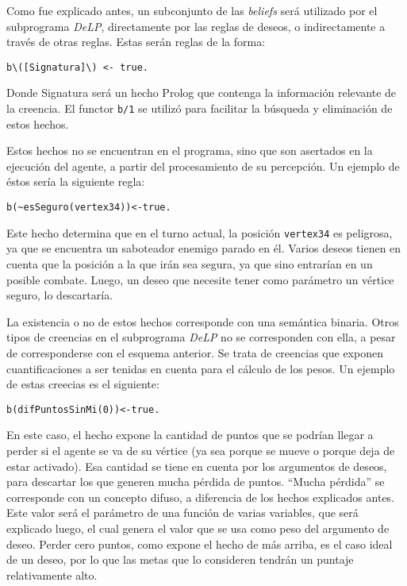 \documentclass[oneside]{book}
\begin{document}
Como fue explicado antes, %
un subconjunto de las  \textit{beliefs} será utilizado por el subprograma 
\textit{DeLP}, directamente por 
las reglas de deseos, o indirectamente a través de otras reglas. Estas serán reglas de 
la forma:

\begin{verbatim}
b\([Signatura]\) <- true.
\end{verbatim}

Donde Signatura será un hecho Prolog que contenga la información relevante de la 
creencia. El functor \texttt{b/1} se utilizó para facilitar la búsqueda y 
eliminación de estos hechos. 

Estos hechos no se encuentran en el programa, sino que son asertados en la ejecución
del agente, a partir del procesamiento de su percepción. 
Un ejemplo de éstos sería la siguiente regla:

\begin{verbatim}
b(~esSeguro(vertex34))<-true.
\end{verbatim}

Este hecho determina que en el turno actual, la posición \texttt{vertex34} es peligrosa,
ya que se encuentra un saboteador enemigo parado en él. Varios deseos tienen en cuenta
que la posición a la que irán sea segura, ya que sino entrarían en un posible combate.
Luego, un deseo que necesite tener como parámetro un vértice seguro, lo descartaría.

La existencia o no de estos hechos corresponde con una semántica binaria. Otros tipos de
creencias en el subprograma \textit{DeLP} no se corresponden con ella, a pesar de corresponderse
con el esquema anterior. Se trata de creencias que exponen cuantificaciones a ser 
tenidas en cuenta para el cálculo de los pesos. Un ejemplo de estas creecias es el 
siguiente:

\begin{verbatim}
b(difPuntosSinMi(0))<-true.
\end{verbatim}

En este caso, el hecho expone la cantidad de puntos que se podrían llegar a perder si el
agente se va de su vértice (ya sea porque se mueve o porque deja de estar activado). Esa
cantidad se tiene en cuenta por los argumentos de deseos, para descartar los que generen
mucha pérdida de puntos. ``Mucha pérdida'' se corresponde con un concepto difuso, a
diferencia de los hechos explicados antes. Este valor será el parámetro de una función
de varias variables, que será explicado luego, el cual genera el valor que se usa como
peso del argumento de deseo. Perder cero puntos, como expone el hecho de más arriba, es el
caso ideal de un deseo, por lo que las metas que lo consideren tendrán un puntaje
relativamente alto.
\end{document}

